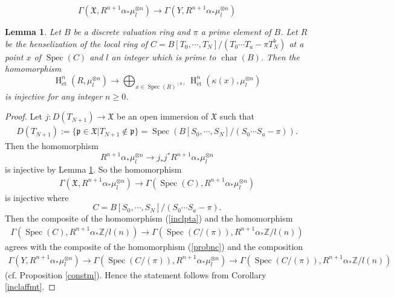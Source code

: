 \documentclass[10pt,a4paper]{amsart}
\newtheorem{lem}{Lemma}
\newcommand{\HO}{\operatorname{H}}
\newcommand{\et}{\mathrm{\acute{e}t}}
\newcommand{\spec}{\operatorname{Spec}}
\begin{document}
\begin{equation}\label{probnc}
\Gamma\left(
\mathfrak{X},
R^{n+1}\alpha_{*}\mu_{l}^{\otimes n}
\right)
\to
\Gamma\left(
Y,
R^{n+1}\alpha_{*}\mu_{l}^{\otimes n}
\right)
\end{equation}

\begin{lem}\upshape\label{nrhenij}
Let $B$ be a discrete valuation ring and $\pi$ a prime element of $B$. Let $R$ 
be the henselization of the local ring of
%
\begin{math}
C=B[T_{0}, \cdots, T_{N}]
/(T_{0}\cdots T_{a}-\pi T_{N}^{b})    
\end{math}
%
at a point $x$ of $\spec(C)$
and $l$ an integer which is prime to $\operatorname{char}(B)$.
%
Then the homomorphism
%
\begin{equation}\label{homnr}
\HO^{n}_{\et}(R, \mu_{l}^{\otimes n})
\to
\displaystyle\bigoplus_{x\in \spec(R)^{(0)}}
\HO^{n}_{\et}(
\kappa(x),
\mu_{l}^{\otimes n}
)
\end{equation}
%
is injective for any integer $n\geq 0$.
\end{lem}

\begin{proof}\upshape
Let 
%
\begin{math}
j: D(T_{N+1})\to  
\mathfrak{X}
\end{math}
%
be an open immersion of $\mathfrak{X}$ such that
%
\begin{align*}
D(T_{N+1})
:=
\{
\mathfrak{p}\in \mathfrak{X}|
T_{N+1}\notin\mathfrak{p}
\}
=\spec(
B[S_{0}, \cdots, S_{N}]/
(S_{0}\cdots S_{a}-\pi)
).
\end{align*}
%
Then the homomorphism
%
\begin{equation*}
R^{n+1}\alpha_{*}\mu_{l}^{\otimes n}
\to 
j_{*}j^{*}R^{n+1}\alpha_{*}\mu_{l}^{\otimes n}
\end{equation*}
%
is injective by Lemma \ref{nrhenij}. So the homomorphism
%
\begin{align}\label{inclpta}
\Gamma\left(
\mathfrak{X},
R^{n+1}\alpha_{*}\mu_{l}^{\otimes n}
\right)
\to
\Gamma\left(
\spec(C),
R^{n+1}\alpha_{*}\mu_{l}^{\otimes n}
\right)
\end{align}
%
is injective where
%
\begin{equation*}
C=
B[S_{0}, \cdots, S_{N}]/
(S_{0}\cdots S_{a}-\pi).    
\end{equation*}
% 
Then the composite of the homomorphism (\ref{inclpta}) and the homomorphism
%
\begin{align*}
\Gamma\left(
\spec(C),
R^{n+1}\alpha_{*}\mathbb{Z}/l(n)
\right)
\to
\Gamma\left(
\spec(C/(\pi)),
R^{n+1}\alpha_{*}\mathbb{Z}/l(n)
\right)
\end{align*}
%
agrees with the composite of the homomorphism (\ref{probnc}) and
the composition
%
\footnotesize
\begin{align*}
\Gamma\left(
Y, 
R^{n+1}\alpha_{*}
\mu_{l}^{\otimes n}
\right) 
\to
\Gamma\left(
\spec(C/(\pi)),
R^{n+1}\alpha_{*}
\mu_{l}^{\otimes n}
\right)
\to
\Gamma\left(
\spec(C/(\pi)),
R^{n+1}\alpha_{*}
\mathbb{Z}/l(n)
\right)
\end{align*}
\normalsize
%
(cf. Proposition \ref{constm}).
Hence the statement follows from Corollary \ref{inclaffmt}.
\end{proof}
\end{document}
